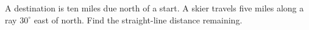 A destination is ten miles due north of a start. A skier travels five miles along a ray $30^\circ$ east of north. Find the straight-line distance remaining.
